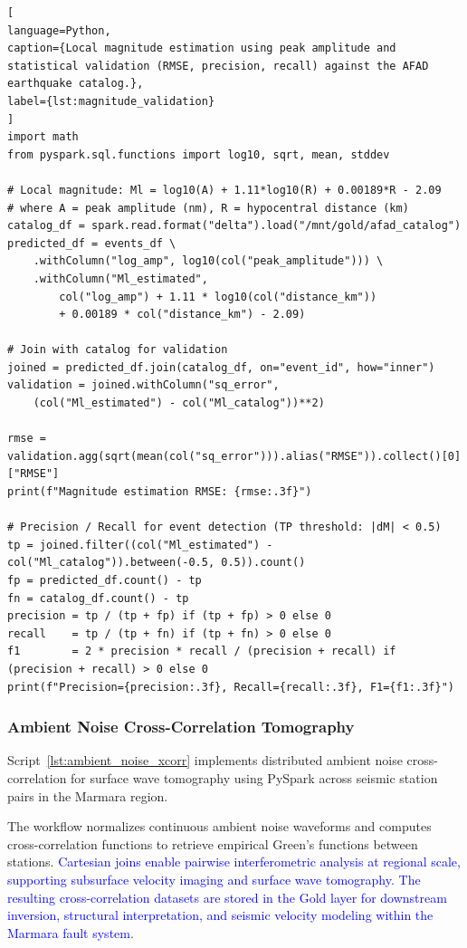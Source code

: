 \documentclass[data,article,submit,pdftex,moreauthors]{Definitions/mdpi}
\begin{document}
\begin{lstlisting}[
language=Python,
caption={Local magnitude estimation using peak amplitude and statistical validation (RMSE, precision, recall) against the AFAD earthquake catalog.},
label={lst:magnitude_validation}
]
import math
from pyspark.sql.functions import log10, sqrt, mean, stddev

# Local magnitude: Ml = log10(A) + 1.11*log10(R) + 0.00189*R - 2.09
# where A = peak amplitude (nm), R = hypocentral distance (km)
catalog_df = spark.read.format("delta").load("/mnt/gold/afad_catalog")
predicted_df = events_df \
    .withColumn("log_amp", log10(col("peak_amplitude"))) \
    .withColumn("Ml_estimated",
        col("log_amp") + 1.11 * log10(col("distance_km"))
        + 0.00189 * col("distance_km") - 2.09)

# Join with catalog for validation
joined = predicted_df.join(catalog_df, on="event_id", how="inner")
validation = joined.withColumn("sq_error",
    (col("Ml_estimated") - col("Ml_catalog"))**2)

rmse = validation.agg(sqrt(mean(col("sq_error"))).alias("RMSE")).collect()[0]["RMSE"]
print(f"Magnitude estimation RMSE: {rmse:.3f}")

# Precision / Recall for event detection (TP threshold: |dM| < 0.5)
tp = joined.filter((col("Ml_estimated") - col("Ml_catalog")).between(-0.5, 0.5)).count()
fp = predicted_df.count() - tp
fn = catalog_df.count() - tp
precision = tp / (tp + fp) if (tp + fp) > 0 else 0
recall    = tp / (tp + fn) if (tp + fn) > 0 else 0
f1        = 2 * precision * recall / (precision + recall) if (precision + recall) > 0 else 0
print(f"Precision={precision:.3f}, Recall={recall:.3f}, F1={f1:.3f}")
\end{lstlisting}

\subsubsection{Ambient Noise Cross-Correlation Tomography}

Script~\ref{lst:ambient_noise_xcorr} implements distributed ambient noise cross-correlation for surface wave tomography using PySpark across seismic station pairs in the Marmara region. 

The workflow normalizes continuous ambient noise waveforms and computes cross-correlation functions to retrieve empirical Green’s functions between stations. \textcolor{blue}{Cartesian joins enable pairwise interferometric analysis at regional scale, supporting subsurface velocity imaging and surface wave tomography. The resulting cross-correlation datasets are stored in the Gold layer for downstream inversion, structural interpretation, and seismic velocity modeling within the Marmara fault system}.
\end{document}
